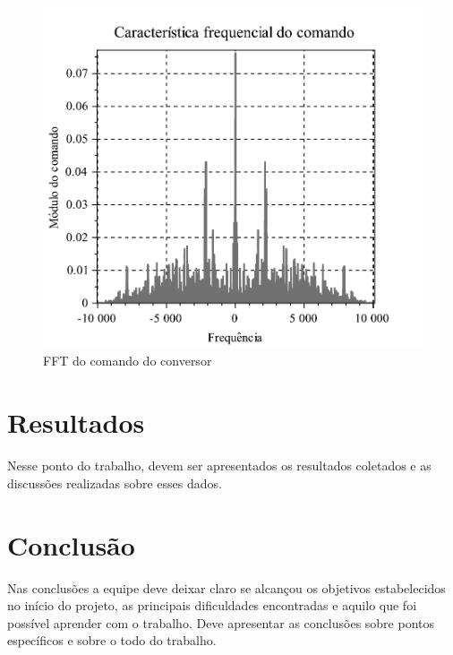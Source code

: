 \documentclass{article}
\begin{document}
\begin{figure}[h] %
    \centering
    \includegraphics[width = \linewidth]{figures/Freq_Com.pdf}
    \caption{FFT do comando do conversor}
    \label{fig:freq}
\end{figure}




\section{Resultados}

Nesse ponto do trabalho, devem ser apresentados os resultados coletados e as discussões realizadas sobre esses dados.


\section{Conclusão}

Nas conclusões a equipe deve deixar claro se alcançou os objetivos estabelecidos no início do projeto, as principais dificuldades encontradas e aquilo que foi possível aprender com o trabalho. Deve apresentar as conclusões sobre pontos específicos e sobre o todo do trabalho.



\end{document}
